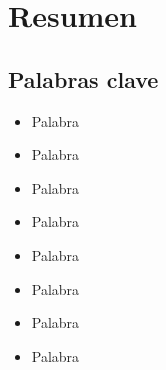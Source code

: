 \chapter*{Resumen}\label{ch:abstract-es}

\lipsum[1-3]

\section*{Palabras clave}\label{sec:keywords-es}
\begin{multicols}{2}
    \begin{itemize}
        \item Palabra
        \item Palabra
        \item Palabra
        \item Palabra
    \end{itemize}
    \columnbreak
    \begin{itemize}
        \item Palabra
        \item Palabra
        \item Palabra
        \item Palabra
    \end{itemize}
\end{multicols}